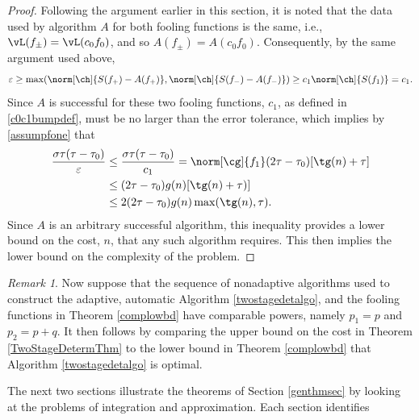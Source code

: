 \documentclass[]{elsarticle}
\theoremstyle{definition}
\theoremstyle{remark}
\newtheorem{rem}{Remark}
\begin{document}
\begin{proof}
Following the argument earlier in this section, it is noted that the data used by algorithm $A$ for both fooling functions is the same, i.e., $\vL(f_{\pm})=\vL(c_0f_0)$, and so $A(f_{\pm})=A(c_0f_0)$.  Consequently, by the same argument used above, 
\[
\varepsilon  \ge  \max(\norm[\ch]{S(f_+)-A(f_+)},\norm[\ch]{S(f_-)-A(f_-)}) \ge c_1 \norm[\ch]{S(f_1)}=c_1.
\]
Since $A$ is successful for these two fooling functions, $c_1$, as defined in \eqref{c0c1bumpdef}, must be no larger than the error tolerance, which implies by \eqref{assumpfone} that 
\begin{align*}
\frac{\sigma \tau(\tau-\tau_0)}{\varepsilon} & \le \frac{\sigma \tau(\tau-\tau_0)}{c_1}  = \norm[\cg]{f_1} (2\tau - \tau_0) [\tg(n) + \tau] \\
&\le (2\tau - \tau_0) g(n) [\tg(n) + \tau)] \\
&\le 2 (2\tau - \tau_0) g(n)\max( \tg(n), \tau).
\end{align*}
Since $A$ is an arbitrary successful algorithm, this inequality provides a lower bound on the cost, $n$, that any such algorithm requires.  This then implies the lower bound on the complexity of the problem.   
\end{proof}

\begin{rem} Now suppose that the sequence of nonadaptive algorithms used to construct the adaptive, automatic Algorithm \ref{twostagedetalgo}, and the fooling functions in Theorem \ref{complowbd} have comparable powers, namely $p_1=p$ and $p_2=p+q$.  It then follows by comparing the upper bound on the cost in Theorem \ref{TwoStageDetermThm} to the lower bound in Theorem \ref{complowbd} that Algorithm \ref{twostagedetalgo} is optimal. 
\end{rem}

\vspace{1cm}

The next two sections illustrate the theorems of Section \ref{genthmsec} by looking at the problems of integration and approximation.  Each section identifies 
\end{document}
